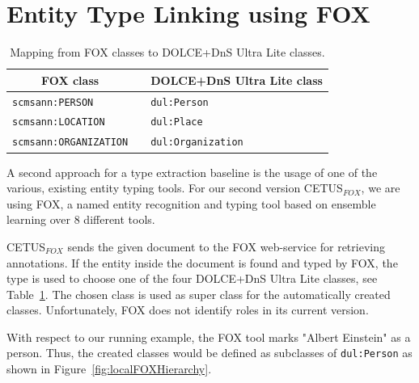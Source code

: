 \section{Entity Type Linking using FOX}
\label{sec:typeLinking}
\begin{table}
\centering
\begin{tabular}{lp{5mm}l}
\toprule
 \multicolumn{1}{c}{FOX class} && DOLCE+DnS Ultra Lite class \\
\midrule
 \texttt{scmsann:PERSON} && \texttt{dul:Person} \\
 \texttt{scmsann:LOCATION} && \texttt{dul:Place} \\
 \texttt{scmsann:ORGANIZATION} && \texttt{dul:Organization} \\
\bottomrule
\end{tabular}
\caption{Mapping from FOX classes to DOLCE+DnS Ultra Lite classes.}
\label{tab:foxclassmatching}
\end{table}


A second approach for a type extraction baseline is the usage of one of the various, existing entity typing tools.
For our second version CETUS$_{FOX}$, we are using FOX, a named entity recognition and typing tool based on ensemble learning over 8 different tools.

CETUS$_{FOX}$ sends the given document to the FOX web-service for retrieving annotations.
If the entity inside the document is found and typed by FOX, the type is used to choose one of the four DOLCE+DnS Ultra Lite classes, see Table~\ref{tab:foxclassmatching}.
The chosen class is used as super class for the automatically created classes.
Unfortunately, FOX does not identify roles in its current version.

With respect to our running example, the FOX tool marks "Albert Einstein" as a person.
Thus, the created classes would be defined as subclasses of \texttt{dul:Person} as shown in Figure~\ref{fig:localFOXHierarchy}.



